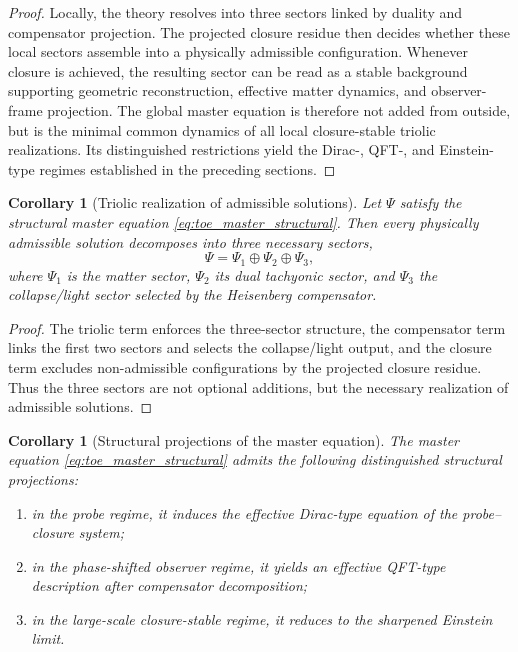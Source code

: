 \documentclass[12pt,a4paper]{article}
\newtheorem{corollary}[theorem]{Corollary}
\begin{document}
\begin{proof}
Locally, the theory resolves into three sectors linked by duality and
compensator projection. The projected closure residue then decides whether
these local sectors assemble into a physically admissible configuration.
Whenever closure is achieved, the resulting sector can be read as a stable
background supporting geometric reconstruction, effective matter dynamics, and
observer-frame projection. The global master equation is therefore not added
from outside, but is the minimal common dynamics of all local closure-stable
triolic realizations. Its distinguished restrictions yield the Dirac-, QFT-,
and Einstein-type regimes established in the preceding sections.
\end{proof}

\begin{corollary}[Triolic realization of admissible solutions]
\label{cor:toe_triolic_realization}
Let $\Psi$ satisfy the structural master equation
\eqref{eq:toe_master_structural}. Then every physically admissible solution
decomposes into three necessary sectors,
\[
\Psi=\Psi_1\oplus\Psi_2\oplus\Psi_3,
\]
where $\Psi_1$ is the matter sector, $\Psi_2$ its dual tachyonic sector, and
$\Psi_3$ the collapse/light sector selected by the Heisenberg compensator.
\end{corollary}

\begin{proof}
The triolic term enforces the three-sector structure, the compensator term
links the first two sectors and selects the collapse/light output, and the
closure term excludes non-admissible configurations by the projected closure
residue. Thus the three sectors are not optional additions, but the necessary
realization of admissible solutions.
\end{proof}

\begin{corollary}[Structural projections of the master equation]
\label{cor:toe_structural_projections}
The master equation \eqref{eq:toe_master_structural} admits the following
distinguished structural projections:
\begin{enumerate}
\item in the probe regime, it induces the effective Dirac-type equation of the
probe--closure system;
\item in the phase-shifted observer regime, it yields an effective QFT-type
description after compensator decomposition;
\item in the large-scale closure-stable regime, it reduces to the sharpened
Einstein limit.
\end{enumerate}
\end{corollary}
\end{document}
